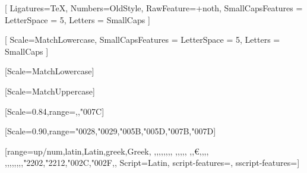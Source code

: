 \setmainfont{Arno Pro}[%
  Ligatures=TeX,
  Numbers=OldStyle,
  RawFeature=+noth,
  SmallCapsFeatures = {%
    LetterSpace = 5,
    Letters = SmallCaps}
]

\setsansfont{Scala Sans Pro}[%
  Scale=MatchLowercase,
  SmallCapsFeatures = {%
    LetterSpace = 5,
    Letters = SmallCaps}
]

\setmonofont{Fira Mono Regular}[Scale=MatchLowercase]







[Scale=MatchUppercase]


[Scale=0.84,range={\int,\odot,"007C}]

[Scale=0.90,range={"0028,"0029,"005B,"005D,"007B,"007D}]

[range={up/{num,latin,Latin,greek,Greek},%
  \mathexclam,\mathplus,\pm,\div,\dagger,\ddagger,\minus,\mathoctothorpe,%
  \mathdollar,\mathpercent,\mathampersand,\mathquestion,\mathatsign,%
  \mathsterling,\mathyen,\euro,\increment,\infty,\checkmark,%
  \less,\equal,\greater,\ne,\leq,\geq,\matheth,\ell,"2202,"2212,"002C,"002F,},%
Script=Latin, script-features={}, sscript-features={}]

